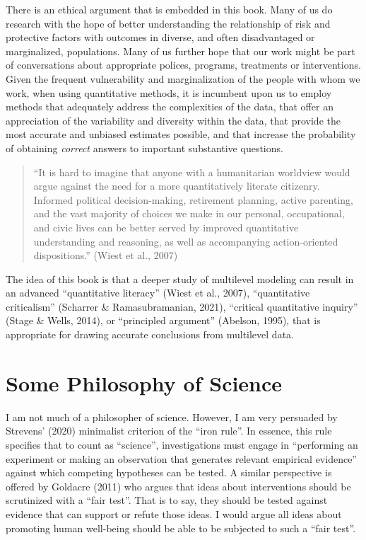 \documentclass[
  letterpaper,
  DIV=11,
  numbers=noendperiod]{scrreprt}
\begin{document}
There is an ethical argument that is embedded in this book. Many of us
do research with the hope of better understanding the relationship of
risk and protective factors with outcomes in diverse, and often
disadvantaged or marginalized, populations. Many of us further hope that
our work might be part of conversations about appropriate polices,
programs, treatments or interventions. Given the frequent vulnerability
and marginalization of the people with whom we work, when using
quantitative methods, it is incumbent upon us to employ methods that
adequately address the complexities of the data, that offer an
appreciation of the variability and diversity within the data, that
provide the most accurate and unbiased estimates possible, and that
increase the probability of obtaining \emph{correct} answers to
important substantive questions.

\begin{quote}
``It is hard to imagine that anyone with a humanitarian worldview would
argue against the need for a more quantitatively literate citizenry.
Informed political decision-making, retirement planning, active
parenting, and the vast majority of choices we make in our personal,
occupational, and civic lives can be better served by improved
quantitative understanding and reasoning, as well as accompanying
action-oriented dispositions.'' (Wiest et al., 2007)
\end{quote}

The idea of this book is that a deeper study of multilevel modeling can
result in an advanced ``quantitative literacy'' (Wiest et al., 2007),
 ``quantitative criticalism'' (Scharrer \&
Ramasubramanian, 2021),  ``critical
quantitative inquiry'' (Stage \& Wells, 2014),
 or ``principled argument''
(Abelson, 1995),  that is appropriate for
drawing accurate conclusions from multilevel data.

\section{Some Philosophy of Science}\label{sec-science}

I am not much of a philosopher of science. However, I am very persuaded
by Strevens' (2020) minimalist criterion of the ``iron rule''. In
essence, this rule specifies that to count as ``science'',
investigations must engage in ``performing an experiment or making an
observation that generates relevant empirical evidence'' against which
competing hypotheses can be tested. A similar perspective is offered by
Goldacre (2011) who argues that ideas about interventions should be
scrutinized with a ``fair test''. That is to say, they should be tested
against evidence that can support or refute those ideas. I would argue
all ideas about promoting human well-being should be able to be
subjected to such a ``fair test''. 
\end{document}
